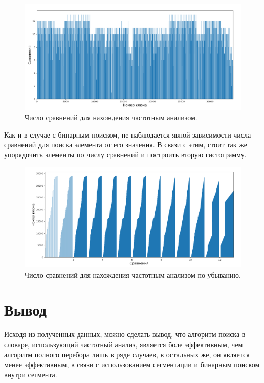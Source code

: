 \documentclass[12pt]{report}
\begin{document}
	\begin{figure}[H]
		\begin{center}
			\includegraphics[width=0.8\linewidth]{img/seg_keys}
			\caption{Число сравнений для нахождения частотным анализом.}
			\label{img:freq}
		\end{center}
	\end{figure}
	
	Как и в случае с бинарным поиском, не наблюдается явной зависимости числа сравнений для поиска элемента от его значения. В связи с этим, стоит так же упорядочить элементы по числу сравнений и построить вторую гистограмму.

	\begin{figure}[H]
		\begin{center}
			\includegraphics[width=0.8\linewidth]{img/seg_comp}
			\caption{Число сравнений для нахождения частотным анализом по убыванию.}
			\label{img:freq_sorted}
		\end{center}
	\end{figure}
	
	\section{Вывод}
	Исходя из полученных данных, можно сделать вывод, что алгоритм поиска в словаре, использующий частотный анализ, является боле эффективным, чем алгоритм полного перебора лишь в ряде случаев, в остальных же, он является менее эффективным, в связи с использованием сегментации и бинарным поиском внутри сегмента.
	
\end{document}

